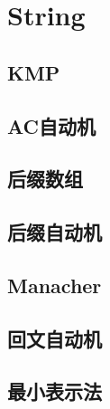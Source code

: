 \chapter{String}
\section{KMP}
\section{AC自动机}
\section{后缀数组}
\section{后缀自动机}
\section{Manacher}
\section{回文自动机}
\section{最小表示法}
